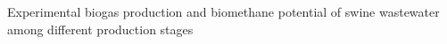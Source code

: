 Experimental biogas production and biomethane potential of swine wastewater among different production stages